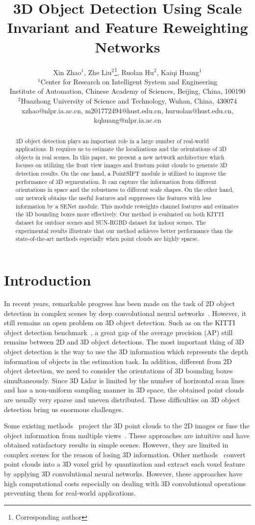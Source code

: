 \documentclass[letterpaper]{article}
\title{3D Object Detection Using Scale Invariant and Feature Reweighting Networks}
\author{Xin Zhao$^1$, Zhe Liu$^{2}$\thanks{Corresponding author}, Ruolan Hu$^2$, Kaiqi Huang$^1$\\
$^1$Center for Research on Intelligent System and Engineering\\
Institute of Automation, Chinese Academy of Sciences, Beijing, China, 100190\\
$^2$Huazhong University of Science and Technology, Wuhan, China, 430074\\
xzhao@nlpr.ia.ac.cn, m201772494@hust.edu.cn, huruolan@hust.edu.cn, kqhuang@nlpr.ia.ac.cn\\
}
\begin{document}
\maketitle
\begin{abstract}
3D object detection plays an important role in a large number of real-world applications. It requires us to estimate the localizations and the orientations of 3D objects in real scenes. In this paper, we present a new network architecture which focuses on utilizing the front view images and frustum point clouds to generate 3D detection results. On the one hand, a PointSIFT module is utilized to improve the performance of 3D segmentation. It can capture the information from different orientations in space and the robustness to different scale shapes. On the other hand, our network obtains the useful features and suppresses the features with less information by a SENet module. This module reweights channel features and estimates the 3D bounding boxes more effectively. Our method is evaluated on both KITTI dataset for outdoor scenes and SUN-RGBD dataset for indoor scenes. The experimental results illustrate that our method achieves better performance than the state-of-the-art methods especially when point clouds are highly sparse.
\end{abstract}


\section{Introduction}
In recent years, remarkable progress has been made on the task of 2D object detection in complex scenes by deep convolutional neural networks~\cite{girshick2015fast,redmon2016you,liu2016ssd}. However, it still remains an open problem on 3D object detection. Such as on the KITTI object detection benchmark~\cite{geiger2012we}, a great gap of the average precision (AP) still remains between 2D and 3D object detections. The most important thing of 3D object detection is the way to use the 3D information which represents the depth information of objects in the estimation task. In addition, different from 2D object detection, we need to consider the orientations of 3D bounding boxes simultaneously. Since 3D Lidar is limited by the number of horizontal scan lines and has a non-uniform sampling manner in 3D space, the obtained point clouds are usually very sparse and uneven distributed. These difficulties on 3D object detection bring us enormous challenges.

Some existing methods~\cite{li2016vehicle,wang2017fusing} project the 3D point clouds to the 2D images or fuse the object information from multiple views~\cite{su2015multi,rubino20183d}. These approaches are intuitive and have obtained satisfactory results in simple scenes. However, they are limited in complex scenes for the reason of losing 3D information. Other methods~\cite{engelcke2017vote3deep,maturana2015voxnet} convert point clouds into a 3D voxel grid by quantization and extract each voxel feature by applying 3D convolutional neural networks. However, these approaches have high computational costs especially on dealing with 3D convolutional operations preventing them for real-world applications.
\end{document}
